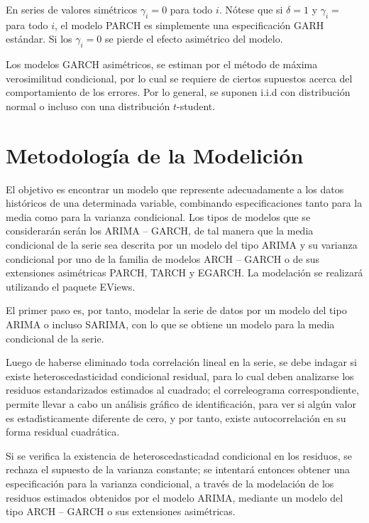 En series de valores sim\'{e}tricos $\gamma_{i}=0$ para
todo $i$. N\'{o}tese que si $\delta =1$ y $\gamma_{i}=$ para todo 
$i$, el modelo PARCH es simplemente una especificaci\'{o}n GARH est\'{a}ndar. 
Si los $\gamma_{i}=0$ se pierde el efecto asim\'{e}trico del modelo.

Los modelos GARCH asim\'{e}tricos, se estiman por el m\'{e}todo de 
m\'{a}xima verosimilitud condicional, por lo cual se requiere de ciertos 
supuestos acerca del comportamiento de los errores. Por lo general, se 
suponen i.i.d con distribuci\'{o}n normal o incluso con una distribuci\'{o}n 
$t$-student.



\section{Metodolog\'ia de la Modelici\'on}

El objetivo es encontrar un modelo que represente adecuadamente a los datos 
hist\'{o}ricos de una determinada variable, combinando especificaciones 
tanto para la media como para la varianza condicional. Los tipos de modelos 
que se considerar\'{a}n ser\'{a}n los ARIMA -- GARCH, de tal manera que la 
media condicional de la serie sea descrita por un modelo del tipo ARIMA y su 
varianza condicional por uno de la familia de modelos ARCH -- GARCH o de sus 
extensiones asim\'{e}tricas PARCH, TARCH y EGARCH. La modelaci\'{o}n se 
realizar\'{a} utilizando el paquete EViews. 

El primer paso es, por tanto, modelar la serie de datos por un modelo del 
tipo ARIMA o incluso SARIMA, con lo que se obtiene un modelo para la media 
condicional de la serie. 

Luego de haberse eliminado toda correlaci\'{o}n lineal en la serie, se debe 
indagar si existe heteroscedasticidad condicional residual, para lo cual 
deben analizarse los residuos estandarizados estimados al cuadrado; el 
correleograma correspondiente, permite llevar a cabo un an\'{a}lisis 
gr\'{a}fico de identificaci\'{o}n, para ver si alg\'{u}n valor es 
estad\'{\i}sticamente diferente de cero, y por tanto, existe 
autocorrelaci\'{o}n en su forma residual cuadr\'{a}tica.

Si se verifica la existencia de heteroscedasticadad condicional en los 
residuos, se rechaza el supuesto de la varianza constante; se intentar\'{a} 
entonces obtener una especificaci\'{o}n para la varianza condicional, a 
trav\'{e}s de la modelaci\'{o}n de los residuos estimados obtenidos por el 
modelo ARIMA, mediante un modelo del tipo ARCH -- GARCH o sus extensiones 
asim\'{e}tricas. 

